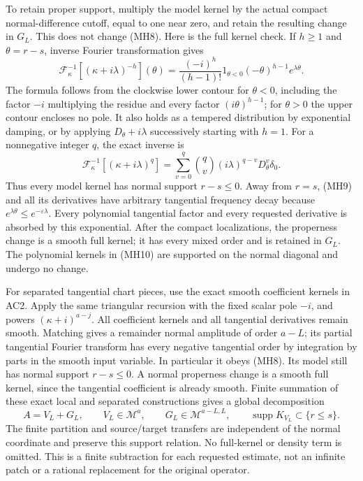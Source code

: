 \documentclass[
  11pt,
]{article}
\begin{document}
To retain proper support, multiply the model kernel by the actual
compact normal-difference cutoff, equal to one near zero, and retain the
resulting change in \(G_L\). This does not change (MH8). Here is the
full kernel check. If \(h\geq1\) and \(\theta=r-s\), inverse Fourier
transformation gives \[
 {\mathcal F}^{-1}_\kappa
       [(\kappa+i\lambda)^{-h}](\theta)
 =\frac{(-i)^h}{(h-1)!}
        1_{\theta<0}(-\theta)^{h-1}e^{\lambda\theta}.
 \tag{MH9}
\] The formula follows from the clockwise lower contour for
\(\theta<0\), including the factor \(-i\) multiplying the residue and
every factor \((i\theta)^{h-1}\); for \(\theta>0\) the upper contour
encloses no pole. It also holds as a tempered distribution by
exponential damping, or by applying \(D_\theta+i\lambda\) successively
starting with \(h=1\). For a nonnegative integer \(q\), the exact
inverse is \[
 {\mathcal F}^{-1}_\kappa[(\kappa+i\lambda)^q]
 =\sum_{v=0}^q\binom qv(i\lambda)^{q-v}D_\theta^v\delta_0.
 \tag{MH10}
\] Thus every model kernel has normal support \(r-s\leq0\). Away from
\(r=s\), (MH9) and all its derivatives have arbitrary tangential
frequency decay because
\(e^{\lambda\theta}\leq e^{-\varepsilon\lambda}\). Every polynomial
tangential factor and every requested derivative is absorbed by this
exponential. After the compact localizations, the properness change is a
smooth full kernel; it has every mixed order and is retained in \(G_L\).
The polynomial kernels in (MH10) are supported on the normal diagonal
and undergo no change.

For separated tangential chart pieces, use the exact smooth coefficient
kernels in AC2. Apply the same triangular recursion with the fixed
scalar pole \(-i\), and powers \((\kappa+i)^{a-j}\). All coefficient
kernels and all tangential derivatives remain smooth. Matching gives a
remainder normal amplitude of order \(a-L\); its partial tangential
Fourier transform has every negative tangential order by integration by
parts in the smooth input variable. In particular it obeys (MH8). Its
model still has normal support \(r-s\leq0\). A normal properness change
is a smooth full kernel, since the tangential coefficient is already
smooth. Finite summation of these exact local and separated
constructions gives a global decomposition \[
 A=V_L+G_L,
 \qquad V_L\in\mathscr M^a,
 \qquad G_L\in\mathscr M^{a-L,L},
 \qquad \operatorname{supp}K_{V_L}\subset\{r\leq s\}.
 \tag{MH11}
\] The finite partition and source/target transfers are independent of
the normal coordinate and preserve this support relation. No full-kernel
or density term is omitted. This is a finite subtraction for each
requested estimate, not an infinite patch or a rational replacement for
the original operator.
\end{document}

